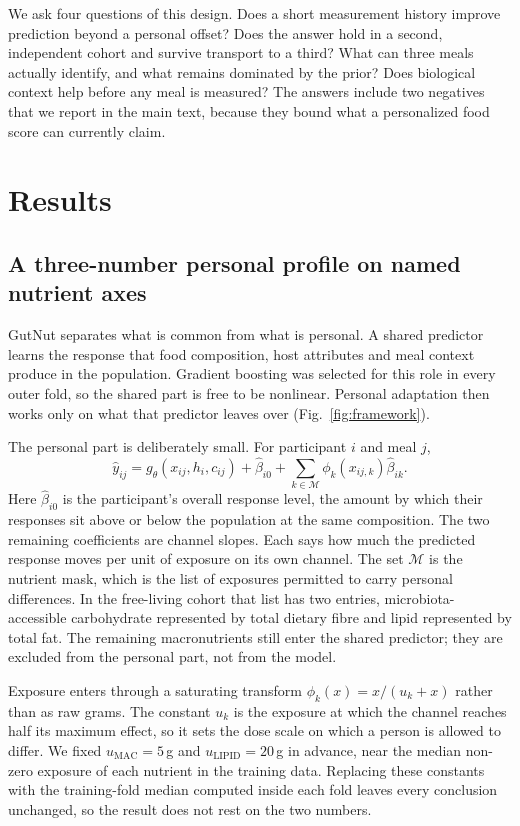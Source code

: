 \documentclass[pdflatex,sn-nature]{sn-jnl}
\theoremstyle{thmstyleone}
\theoremstyle{thmstyletwo}
\theoremstyle{thmstylethree}
\begin{document}
We ask four questions of this design. Does a short measurement history improve prediction beyond a personal offset? Does the answer hold in a second, independent cohort and survive transport to a third? What can three meals actually identify, and what remains dominated by the prior? Does biological context help before any meal is measured? The answers include two negatives that we report in the main text, because they bound what a personalized food score can currently claim.

\section{Results}\label{sec2}
\subsection{A three-number personal profile on named nutrient axes}

GutNut separates what is common from what is personal. A shared predictor learns the response that food composition, host attributes and meal context produce in the population. Gradient boosting was selected for this role in every outer fold, so the shared part is free to be nonlinear. Personal adaptation then works only on what that predictor leaves over (Fig.~\ref{fig:framework}).

The personal part is deliberately small. For participant $i$ and meal $j$,
\begin{equation}
\widehat y_{ij}=g_\theta(x_{ij},h_i,c_{ij})+\widehat\beta_{i0}
 +\sum_{k\in\mathcal M}\phi_k(x_{ij,k})\widehat\beta_{ik}.
\label{eq:prediction}
\end{equation}
Here $\widehat\beta_{i0}$ is the participant's overall response level, the amount by which their responses sit above or below the population at the same composition. The two remaining coefficients are channel slopes. Each says how much the predicted response moves per unit of exposure on its own channel. The set $\mathcal M$ is the nutrient mask, which is the list of exposures permitted to carry personal differences. In the free-living cohort that list has two entries, microbiota-accessible carbohydrate represented by total dietary fibre and lipid represented by total fat. The remaining macronutrients still enter the shared predictor; they are excluded from the personal part, not from the model.

Exposure enters through a saturating transform $\phi_k(x)=x/(u_k+x)$ rather than as raw grams. The constant $u_k$ is the exposure at which the channel reaches half its maximum effect, so it sets the dose scale on which a person is allowed to differ. We fixed $u_{\mathrm{MAC}}=5$\,g and $u_{\mathrm{LIPID}}=20$\,g in advance, near the median non-zero exposure of each nutrient in the training data. Replacing these constants with the training-fold median computed inside each fold leaves every conclusion unchanged, so the result does not rest on the two numbers.
\end{document}
